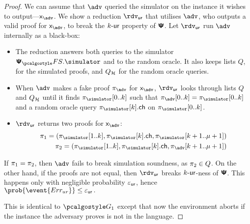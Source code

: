 \documentclass[runningheads,10pt]{llncs}
\begin{document}
\begin{proof}
  We can assume that $\adv$ queried the simulator on the instance it wishes to
  output---$\inp_{\adv}$. We show a reduction $\rdvur$ that utilises $\adv$,
  who outputs a valid proof for $\inp_{\adv}$, to break the ${k\text{-}\mathsf{ur}}$ property of
  $\bm{\mathsf{\Psi}}$. Let $\rdvur$ run $\advse$ internally as a black-box:
  \begin{itemize}
	\item The reduction answers both queries to the simulator $\psfs.\simulator$
    and to the random oracle.  It also keeps lists $Q$, for the simulated
    proofs, and $Q_{\mathcal{H}}$ for the random oracle queries.
  \item When $\adv$ makes a fake proof $\zkproof_{\adv}$ for $\inp_{\adv}$,
    $\rdvur$ looks through lists $Q$ and $Q_{\mathcal{H}}$ until it finds
    $\zkproof_{\simulator}[0..k]$ such that
    $\zkproof_{\adv}[0..k] = \zkproof_{\simulator}[0..k]$ and a random oracle
    query $\zkproof_{\simulator}[k].\ch$ on $\zkproof_{\simulator}[0..k]$.
	\item $\rdvur$ returns two proofs for $\inp_{\adv}$:
	\begin{align*}
		\zkproof_1 = (\zkproof_{\simulator}[1..k],
		\zkproof_{\simulator}[k].\ch, \zkproof_{\simulator}[k + 1..\mu + 1])\\
		\zkproof_2 = (\zkproof_{\simulator}[1..k],
		\zkproof_{\simulator}[k].\ch, \zkproof_{\adv}[k + 1..\mu + 1])
	\end{align*}
	\end{itemize}  
	If $\pi_1 = \pi_2$, then $\adv$ fails to break simulation soundness,
  as $\pi_2 \in Q$. On the other hand, if the proofs are not equal, then
  $\rdvur$ breaks ${k\text{-}\mathsf{ur}}$-ness of $\bm{\mathsf{\Psi}}$. This happens only with negligible
  probability $\varepsilon_{\mathsf{ur}}$, hence \( \prob{\event{\errur}} \leq \epsur\,. \)
	
   This is identical to $\game{1}$ except that now the environment
  aborts if the instance the adversary proves is not in the language.


\end{proof}
\end{document}
